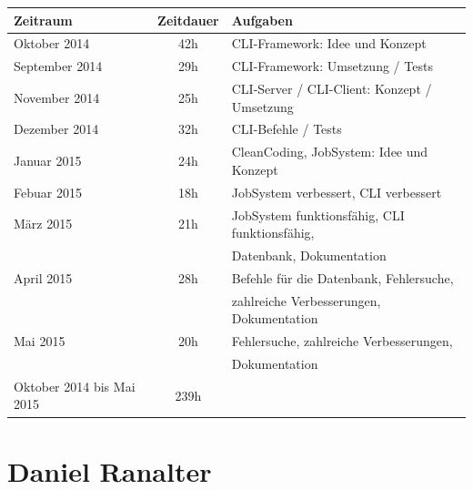 \documentclass[12pt,a4paper]{report}
\begin{document}
\begin{onehalfspace}
\begin{center}
\begin{tabular}{|l|c|l|}
\hline
\textbf{Zeitraum} & \textbf{Zeitdauer} & \textbf{Aufgaben} \\ \hline \hline
Oktober 2014 & 42h & CLI-Framework: Idee und Konzept\\ \hline
September 2014 & 29h & CLI-Framework: Umsetzung / Tests\\ \hline
November 2014 & 25h & CLI-Server / CLI-Client: Konzept / Umsetzung\\ \hline
Dezember 2014 & 32h & CLI-Befehle / Tests\\ \hline
Januar 2015 & 24h & CleanCoding, JobSystem: Idee und Konzept\\ \hline
Febuar 2015 & 18h & JobSystem verbessert, CLI verbessert\\ \hline
März 2015 & 21h & JobSystem funktionsfähig, CLI funktionsfähig, \\&& Datenbank, Dokumentation\\ \hline
April 2015 & 28h & Befehle für die Datenbank, Fehlersuche, \\&& zahlreiche Verbesserungen,  Dokumentation \\ \hline
Mai 2015 & 20h & Fehlersuche, zahlreiche Verbesserungen, \\&& Dokumentation\\ \hline \hline
Oktober 2014 bis Mai 2015 & 239h &\\ \hline

\end{tabular}
\end{center}

\chapter{Daniel Ranalter}

\begin{tabular}{|l|c|l|}


\end{tabular}
\end{onehalfspace}
\end{document}
